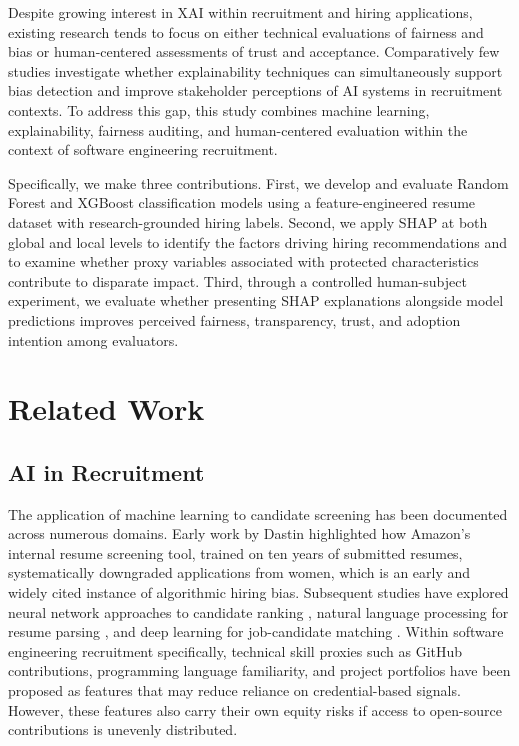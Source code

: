 \documentclass[conference]{IEEEtran}
\begin{document}
Despite growing interest in XAI within recruitment and hiring applications, existing research tends to focus on either technical evaluations of fairness and bias or human-centered assessments of trust and acceptance. Comparatively few studies investigate whether explainability techniques can simultaneously support bias detection and improve stakeholder perceptions of AI systems in recruitment contexts. To address this gap, this study combines machine learning, explainability, fairness auditing, and human-centered evaluation within the context of software engineering recruitment.

Specifically, we make three contributions. First, we develop and evaluate Random Forest and XGBoost classification models using a feature-engineered resume dataset with research-grounded hiring labels. Second, we apply SHAP at both global and local levels to identify the factors driving hiring recommendations and to examine whether proxy variables associated with protected characteristics contribute to disparate impact. Third, through a controlled human-subject experiment, we evaluate whether presenting SHAP explanations alongside model predictions improves perceived fairness, transparency, trust, and adoption intention among evaluators.

\section{Related Work}

\subsection{AI in Recruitment}

The application of machine learning to candidate screening has been documented across numerous domains. Early work by Dastin \cite{dastin2018} highlighted how Amazon's internal resume screening tool, trained on ten years of submitted resumes, systematically downgraded applications from women, which is an early and widely cited instance of algorithmic hiring bias. Subsequent studies have explored neural network approaches to candidate ranking \cite{qin2018}, natural language processing for resume parsing \cite{naous2023}, and deep learning for job-candidate matching \cite{jiang2020}. Within software engineering recruitment specifically, technical skill proxies such as GitHub contributions, programming language familiarity, and project portfolios have been proposed as features that may reduce reliance on credential-based signals. However, these features also carry their own equity risks if access to open-source contributions is unevenly distributed.
\end{document}
